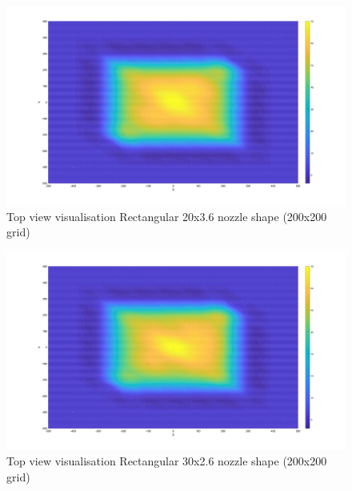 \begin{figure}
    \centering
    \includegraphics[width=0.75\linewidth]{Images/Rec20_top.jpg}
    \caption{Top view visualisation Rectangular 20x3.6 nozzle shape (200x200 grid)}
\end{figure}

\begin{figure}
    \centering
    \includegraphics[width=0.75\linewidth]{Images/Rec30_top.jpg}
    \caption{Top view visualisation Rectangular 30x2.6 nozzle shape (200x200 grid)}
\end{figure}
